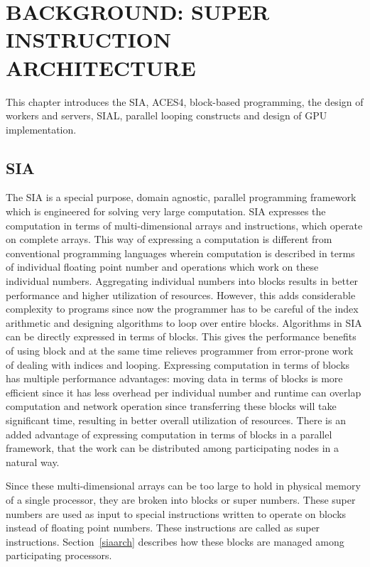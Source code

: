 \chapter{BACKGROUND: SUPER INSTRUCTION ARCHITECTURE} \label{background}

This chapter introduces the SIA, ACES4, block-based
programming, the design of workers and servers, SIAL, parallel looping constructs
and design of GPU implementation.

\section{SIA}
The SIA is a special purpose, domain agnostic,
parallel programming framework which is engineered for solving very large
computation. SIA expresses the computation in terms of multi-dimensional arrays and
instructions, which operate on complete arrays. This way of expressing a computation
is different from conventional programming
languages wherein computation is described in terms of individual floating point
number and operations which work on these individual numbers. Aggregating
individual numbers into blocks results in better performance and higher utilization
of resources. However, this adds considerable complexity to programs since now
the programmer has to be careful of the index arithmetic and designing algorithms to loop
over entire blocks. Algorithms in SIA can be directly expressed in terms of
blocks. This gives the performance benefits of using block and at the same time relieves
programmer from error-prone work of dealing with indices and looping. Expressing
computation in terms of blocks has multiple performance advantages: moving data in terms
of blocks is more efficient since it has less overhead per individual number
and runtime can overlap computation and network operation since transferring these
blocks will take significant time, resulting in better overall utilization of resources.
There is an added advantage of expressing computation in terms of blocks in a parallel
framework, that the work can be distributed among participating nodes in a natural
way.

Since these multi-dimensional arrays can be too
large to hold in physical memory of a single processor, they are broken into
blocks or super numbers. These super numbers are used as input to special instructions
written to operate on blocks instead of floating point numbers. These
instructions are called as super instructions. Section~\ref{siaarch} describes how
these blocks are managed among participating processors.


